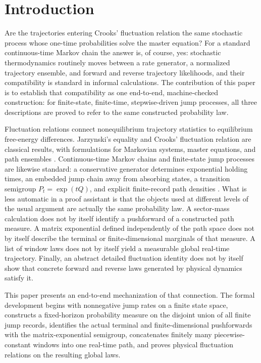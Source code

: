 \section{Introduction}

Are the trajectories entering Crooks' fluctuation relation the same stochastic process whose one-time probabilities solve the master equation? For a standard continuous-time Markov chain the answer is, of course, yes: stochastic thermodynamics routinely moves between a rate generator, a normalized trajectory ensemble, and forward and reverse trajectory likelihoods, and their compatibility is standard in informal calculations. The contribution of this paper is to establish that compatibility as one end-to-end, machine-checked construction: for finite-state, finite-time, stepwise-driven jump processes, all three descriptions are proved to refer to the same constructed probability law.

Fluctuation relations connect nonequilibrium trajectory statistics to equilibrium free-energy differences. Jarzynski's equality and Crooks' fluctuation relation are classical results, with formulations for Markovian systems, master equations, and path ensembles \parencite{Jarzynski1997PRL,Jarzynski1997PRE,Crooks1998,Crooks1999,Crooks2000}. Continuous-time Markov chains and finite-state jump processes are likewise standard: a conservative generator determines exponential holding times, an embedded jump chain away from absorbing states, a transition semigroup $P_t=\exp(tQ)$, and explicit finite-record path densities \parencite{Norris1997,Gardiner2009,RaoTeh2013}.
What is less automatic in a proof assistant is that the objects used at different levels of the usual argument are actually the same probability law. A sector-mass calculation does not by itself identify a pushforward of a constructed path measure. A matrix exponential defined independently of the path space does not by itself describe the terminal or finite-dimensional marginals of that measure. A list of window laws does not by itself yield a measurable global real-time trajectory. Finally, an abstract detailed fluctuation identity does not by itself show that concrete forward and reverse laws generated by physical dynamics satisfy it.

This paper presents an end-to-end mechanization of that connection. The formal development begins with nonnegative jump rates on a finite state space, constructs a fixed-horizon probability measure on the disjoint union of all finite jump records, identifies the actual terminal and finite-dimensional pushforwards with the matrix-exponential semigroup, concatenates finitely many piecewise-constant windows into one real-time path, and proves physical fluctuation relations on the resulting global laws.

